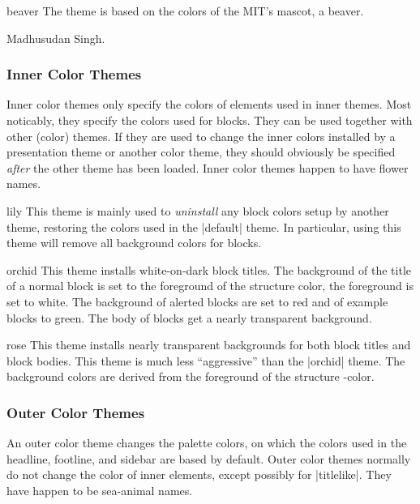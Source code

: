 \begin{colorthemeexample}{beaver}
  The theme is based on the colors of the MIT's mascot, a beaver.

  \themeauthor Madhusudan Singh.
\end{colorthemeexample}

\subsubsection{Inner Color Themes}

Inner color themes only specify the colors of elements used in inner themes. Most noticably, they specify the colors used for blocks. They can be used together with other (color) themes. If they are used to change the inner colors installed by a presentation theme or another color theme, they should obviously be specified \emph{after} the other theme has been loaded. Inner color themes happen to have flower names.

\begin{colorthemeexample}{lily}
  This theme is mainly used to \emph{uninstall} any block colors setup by another theme, restoring the colors used in the |default| theme. In particular, using this theme will remove all background colors for blocks.
\end{colorthemeexample}

\begin{colorthemeexample}{orchid}
  This theme installs white-on-dark block titles. The background of the title of a normal block is set to the foreground of the structure color, the foreground is set to white. The background of alerted blocks are set to red and of example blocks to green. The body of blocks get a nearly transparent background.
\end{colorthemeexample}

\begin{colorthemeexample}{rose}
  This theme installs nearly transparent backgrounds for both block titles and block bodies. This theme is much less ``aggressive'' than the |orchid| theme. The background colors are derived from the foreground of the structure \beamer-color.
\end{colorthemeexample}

\subsubsection{Outer Color Themes}

An outer color theme changes the palette colors, on which the colors used in the headline, footline, and sidebar are based by default. Outer color themes normally do not change the color of inner elements, except possibly for |titlelike|. They have happen to be sea-animal names.

